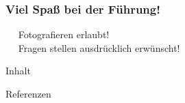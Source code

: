 \documentclass[10pt,t]{beamer}
\begin{document}

\begin{frame}
\frametitle{Viel Spaß bei der Führung!}
\textbullet~~ Fotografieren erlaubt! \\
\textbullet~~ Fragen stellen ausdrücklich erwünscht!
\end{frame}

\begin{frame}{Inhalt}
\tableofcontents
\end{frame}

\begin{frame}[allowframebreaks]{Referenzen}
\tiny{}

\end{frame}
\end{document}
